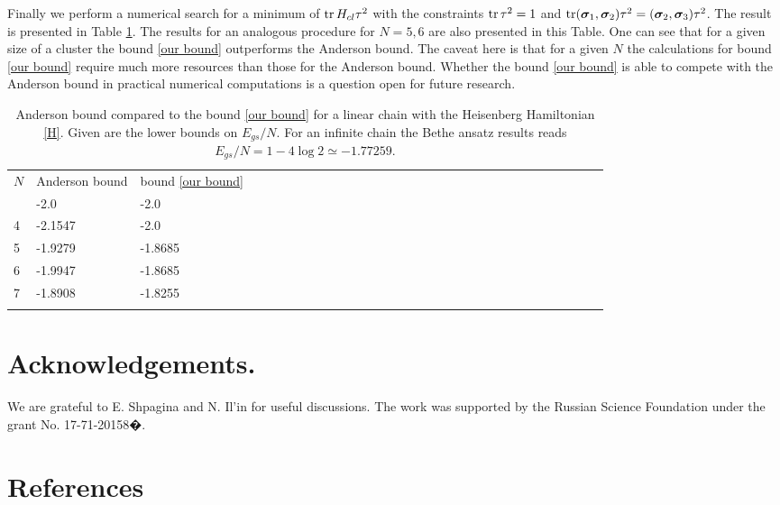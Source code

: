 \documentclass[a4paper]{jpconf}
\renewcommand\[{\begin{equation}}
\renewcommand\]{\end{equation}}
\newcommand{\ssigma}{{\bm \sigma}}
\newcommand{\A}{{\cal A}}
\begin{document}
Finally we perform a numerical search for a minimum of $\mathop{\mathrm{tr}}\nolimits H_{cl} \tau^2 $ with the constraints $\mathop{\mathrm{tr}}\nolimits  \tau^2 =1$ and $\tr  (\ssigma_1,\ssigma_2)\tau^2 =(\ssigma_2,\ssigma_3)\tau^2$. The result is presented in Table \ref{result}. The results for an analogous procedure for $N=5,6$ are also presented in this Table. One can see that for a given size of a cluster the bound \eqref{our bound} outperforms the Anderson bound. The caveat here is that for a given $N$ the calculations for  bound \eqref{our bound} require much more resources than those for the Anderson bound.   Whether  the bound \eqref{our bound} is able to compete with the Anderson bound in practical numerical computations is a question open for future research.






\begin{table}
	\caption{\label{result}Anderson bound compared to the bound \eqref{our bound} for a linear chain with the Heisenberg Hamiltonian \eqref{H}. Given are the lower bounds on $E_{gs}/N$. For an infinite chain the Bethe ansatz results reads $E_{gs}/N=1-4\log 2\simeq -1.77259.$}
	\begin{center}
		\begin{tabular}{lllllllllllllllllllllllllllllll}
			\br
			$N$&Anderson bound& bound \eqref{our bound}\\
			\mr
			3 &-2.0     & -2.0\\
			4 &-2.1547  & -2.0\\
			5 &-1.9279 & -1.8685\\
			6 &-1.9947 & -1.8685\\
			7 &-1.8908 & -1.8255\\
			\br
		\end{tabular}
	\end{center}
\end{table}

\section*{Acknowledgements.} We are grateful to E. Shpagina and N. Il'in for useful discussions. The work was supported by the Russian Science Foundation under the grant No. 17-71-20158�.

\section*{References}
\end{document}
